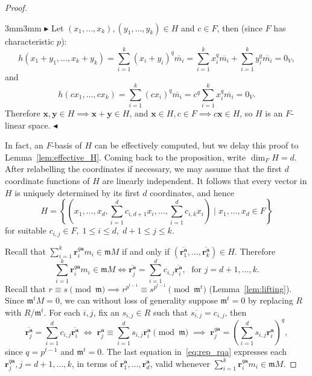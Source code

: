 \documentclass[letterpaper, 11pt, thm-restate]{article}
\numberwithin{equation}{section}
\newcommand{\ba}{\boldsymbol{a}}
\newcommand{\by}{\boldsymbol{y}}
\newcommand{\bx}{\boldsymbol{x}}
\newcommand{\br}{\boldsymbol{r}}
\newcommand{\frm}{\mathfrak{m}}
\theoremstyle{definition}
\theoremstyle{definition}
\theoremstyle{definition}
\begin{document}
\begin{proof}
\begin{adjustwidth}{3mm}{3mm}
    \noindent$\blacktriangleright$
    Let $(x_1, \ldots ,x_k), (y_1, \ldots ,y_k) \in H$ and $c \in F$, then (since $F$ has characteristic $p$):
    \[
    h(x_1 + y_1, \ldots ,x_k + y_k) = \sum_{i=1}^k (x_i+y_i)^q \overline{m_i} = \sum_{i=1}^k x_i^q \overline{m_i} + \sum_{i=1}^k y_i^q \overline{m_i} = 0_V,
    \]
    and
    \[
    h(cx_1, \ldots , c x_k) = \sum_{i=1}^k (cx_i)^q \overline{m_i} = c^q \sum_{i=1}^k x_i^q \overline{m_i} = 0_V.
    \]
    Therefore $\bx, \by \in H \implies \bx+\by \in H$, and $\bx \in H, c \in F \implies c \bx \in H$, so $H$ is an $F$-linear space.
    \hfill $\blacktriangleleft$
    \end{adjustwidth}
    \medskip

    \noindent In fact, an $F$-basis of $H$ can be effectively computed, but we delay this proof to Lemma~\ref{lem:effective_H}.
    Coming back to the proposition, write $\dim_{F} H=d$. 
    After relabelling the coordinates if necessary, we may assume that the first $d$ coordinate functions of $H$ are linearly independent. 
    It follows that every vector in $H$ is uniquely determined by its first $d$ coordinates, and hence
    \[
    \textstyle
    H = \left\{\left(x_1, \ldots, x_d, \sum_{i = 1}^d c_{i, d+1} x_i, \ldots, \sum_{i = 1}^d c_{i, k} x_i \right) \mid x_1, \ldots, x_d \in F\right\}
    \]
    for suitable $c_{i, j} \in F,\; 1 \leq i \leq d,\; d+1 \leq j \leq k$.

    Recall that $\sum_{i=1}^k \br_i^{q\ba}m_i \in \frm M$ if and only if $\left(\overline{\br_1^{\ba}}, \ldots, \overline{\br_k^{\ba}}\right) \in H$. Therefore
    \begin{equation*}
    \sum_{i=1}^k \br_i^{q\ba}m_i \in \frm M \iff \overline{\br_j^{\ba}}=\sum_{i = 1}^d c_{i,j} \overline{\br_i^{\ba}}, \; \text{ for } j = d+1, \ldots, k. 
    \end{equation*}
    Recall that $r \equiv s \pmod{\frm} \implies r^{p^{t-1}} \equiv s^{p^{t-1}} \pmod{\frm^t}$ (Lemma~\ref{lem:lifting}).
    Since $\frm^t M = 0$, we can without loss of generality suppose $\frm^t = 0$ by replacing $R$ with $R/\frm^t$.
    For each $i, j$, fix an $s_{i,j} \in R$ such that $\overline{s_{i,j}}=c_{i,j}$, then
    \begin{equation}\label{eq:rep_rqa}
    \overline{\br_j^{\ba}}=\sum_{i = 1}^d c_{i,j} \overline{\br_i^{\ba}} \;\iff\; \br_j^{\ba} \equiv \sum_{i = 1}^d s_{i,j}\br_i^{\ba} \pmod{\frm} \;\implies\; \br_{j}^{q\ba} = \left( \sum_{i = 1}^d s_{i,j}\br_i^{\ba} \right)^q,
    \end{equation}
    since $q = p^{t-1}$ and $\frm^t = 0$.
    The last equation in~\eqref{eq:rep_rqa} expresses each $\br_{j}^{q\ba}, j = d+1, \ldots, k$, in terms of $\br_{1}^{\ba}, \ldots, \br_{d}^{\ba}$, valid whenever $\sum_{i=1}^k \br_i^{q\ba}m_i \in \frm M$.
    \smallskip


\end{proof}
\end{document}
